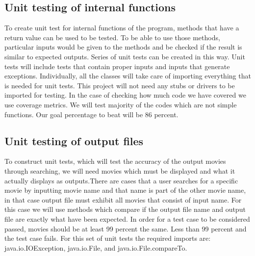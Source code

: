 \documentclass[12pt, titlepage]{article}
\begin{document}
\subsection{Unit testing of internal functions}
To create unit test for internal functions of the program, methods that have a return value can be used to be tested. To be able to use those methods, particular inputs would be given to the methods and be checked if the result is similar to expected outputs. Series of unit tests can be created in this way. Unit tests will include tests that contain proper inputs and inputs that generate exceptions. Individually, all the classes will take care of importing everything that is needed for unit tests. This project will not need any stubs or drivers to be imported for testing. In the case of checking how much code we have covered we use coverage metrics. We will test majority of the codes which are not simple functions. Our goal percentage to beat will be 86 percent.
		
\subsection{Unit testing of output files}		
To construct unit tests, which will test the accuracy of the output movies through searching, we will need movies which must be displayed and what it actually displays as outputs.There are cases that a user searches for a specific movie by inputting movie name and that name is part of the other movie name, in that case output file must exhibit all movies that consist of input name. For this case we will use methods which compare if the output file name and output file are exactly what have been expected. In order for a test case to be considered passed, movies should be at least 99 percent the same. Less than 99 percent and the test case fails. For this set of unit tests the required imports are:  java.io.IOException,  java.io.File, and java.io.File.compareTo.
\end{document}
